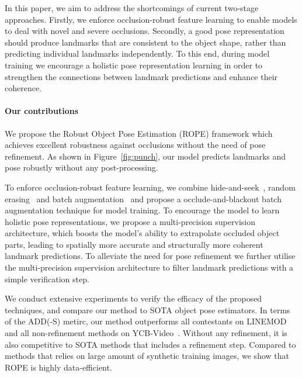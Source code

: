 \documentclass[10pt,twocolumn,letterpaper]{article}
\begin{document}
In this paper, we aim to address the shortcomings of current two-stage approaches. Firstly, we enforce occlusion-robust feature learning to enable models to deal with novel and severe occlusions. Secondly, a good pose representation should produce landmarks that are consistent to the object shape, rather than predicting individual landmarks independently. To this end, during model training we encourage a holistic pose representation learning in order to strengthen the connections between landmark predictions and enhance their coherence. 






















\paragraph{Our contributions} We propose the Robust Object Pose Estimation (ROPE) framework which achieves excellent robustness against occlusions without the need of pose refinement. 
As shown in Figure~\ref{fig:punch}, our model predicts landmarks and pose robustly without any post-processing.  



To enforce occlusion-robust feature learning, we combine hide-and-seek~\cite{Singh2017hide}, random erasing~\cite{Zhong2020random} and batch augmentation~\cite{Hoffer2020augment} and propose a occlude-and-blackout batch augmentation technique for model training. To encourage the model to learn holistic pose representations, we propose a multi-precision supervision architecture, which boosts the model's ability to extrapolate occluded object parts, leading to spatially more accurate and structurally more coherent landmark predictions. 
To alleviate the need for pose refinement we further utilise the multi-precision supervision architecture to filter landmark predictions with a simple verification step. 

We conduct extensive experiments to verify the efficacy of the proposed techniques, and compare our method to SOTA object pose estimators. In terms of the ADD(-S) metirc, our method outperforms all contestants on LINEMOD~\cite{Hinterstoisser2012model} and all non-refinement methods on YCB-Video~\cite{Xiang2018posecnn}. Without any refinement, it is also competitive to SOTA methods that includes a refinement step. Compared to methods that relies on large amount of synthetic training images, we show that ROPE is highly data-efficient. 
\end{document}
